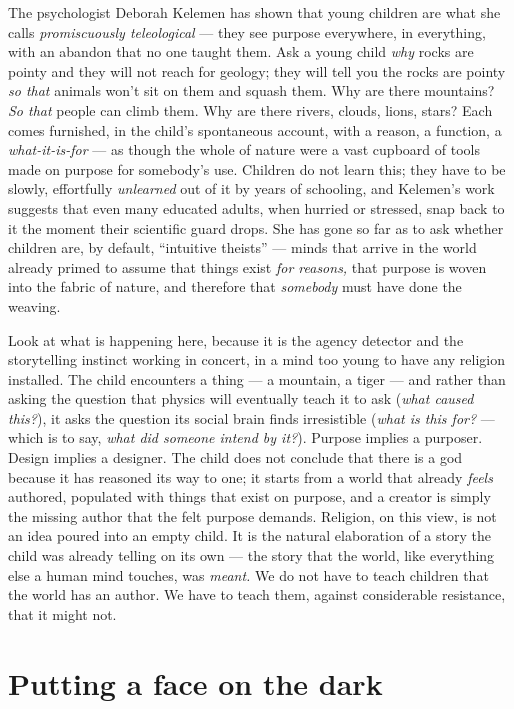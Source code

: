 The psychologist Deborah Kelemen has shown that young children are what she calls \emph{promiscuously teleological} — they see purpose everywhere, in everything, with an abandon that no one taught them. Ask a young child \emph{why} rocks are pointy and they will not reach for geology; they will tell you the rocks are pointy \emph{so that} animals won't sit on them and squash them. Why are there mountains? \emph{So that} people can climb them. Why are there rivers, clouds, lions, stars? Each comes furnished, in the child's spontaneous account, with a reason, a function, a \emph{what-it-is-for} — as though the whole of nature were a vast cupboard of tools made on purpose for somebody's use. Children do not learn this; they have to be slowly, effortfully \emph{unlearned} out of it by years of schooling, and Kelemen's work suggests that even many educated adults, when hurried or stressed, snap back to it the moment their scientific guard drops. She has gone so far as to ask whether children are, by default, ``intuitive theists'' — minds that arrive in the world already primed to assume that things exist \emph{for reasons,} that purpose is woven into the fabric of nature, and therefore that \emph{somebody} must have done the weaving.

Look at what is happening here, because it is the agency detector and the storytelling instinct working in concert, in a mind too young to have any religion installed. The child encounters a thing — a mountain, a tiger — and rather than asking the question that physics will eventually teach it to ask (\emph{what caused this?}), it asks the question its social brain finds irresistible (\emph{what is this for?} — which is to say, \emph{what did someone intend by it?}). Purpose implies a purposer. Design implies a designer. The child does not conclude that there is a god because it has reasoned its way to one; it starts from a world that already \emph{feels} authored, populated with things that exist on purpose, and a creator is simply the missing author that the felt purpose demands. Religion, on this view, is not an idea poured into an empty child. It is the natural elaboration of a story the child was already telling on its own — the story that the world, like everything else a human mind touches, was \emph{meant.} We do not have to teach children that the world has an author. We have to teach them, against considerable resistance, that it might not.

\section*{Putting a face on the dark}

